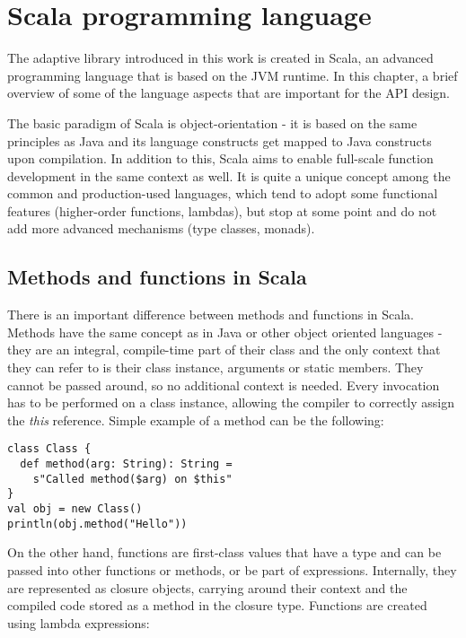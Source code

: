 \chapter{Scala programming language}

The adaptive library introduced in this work is created in Scala, an advanced programming language that is based on the JVM runtime. In this chapter, a brief overview of some of the language aspects that are important for the API design.

The basic paradigm of Scala is object-orientation - it is based on the same principles as Java and its language constructs get mapped to Java constructs upon compilation. In addition to this, Scala aims to enable full-scale function development in the same context as well. It is quite a unique concept among the common and production-used languages, which tend to adopt some functional features (higher-order functions, lambdas), but stop at some point and do not add more advanced mechanisms (type classes, monads).

\section{Methods and functions in Scala}
\label{sec:metandfun}

There is an important difference between methods and functions in Scala. Methods have the same concept as in Java or other object oriented languages - they are an integral, compile-time part of their class and the only context that they can refer to is their class instance, arguments or static members. They cannot be passed around, so no additional context is needed. Every invocation has to be performed on a class instance, allowing the compiler to correctly assign the \textit{this} reference. Simple example of a method can be the following:

\lstset{style=Scala}
\begin{lstlisting}
class Class {
  def method(arg: String): String = 
    s"Called method($arg) on $this"
}
val obj = new Class()
println(obj.method("Hello"))
\end{lstlisting}

On the other hand, functions are first-class values that have a type and can be passed into other functions or methods, or be part of expressions. Internally, they are represented as closure objects, carrying around their context and the compiled code stored as a method in the closure type. Functions are created using lambda expressions:

